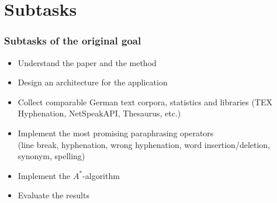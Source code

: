 \documentclass{beamer}
\begin{document}

\section{Subtasks}
\begin{frame}
\frametitle{Subtasks of the original goal}
\begin{itemize}
	\item Understand the paper and the method
	\item Design an architecture for the application	
	\item Collect comparable German text corpora, statistics and libraries
	(TEX Hyphenation, NetSpeakAPI, Thesaurus, etc.)
	\item Implement the most promising paraphrasing operators\\
	(line break, hyphenation, wrong 
	hyphenation, word insertion/deletion, synonym, spelling)
	\item Implement the $A^*$-algorithm
	\item Evaluate the results
	
	
	
\end{itemize}
\end{frame}



\end{document}

